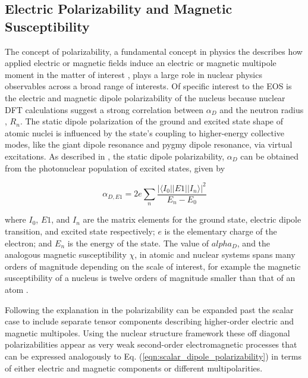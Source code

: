 \documentclass[cnatzke_thesis_proposal.tex]{subfiles}
\begin{document}
\subsection{Electric Polarizability and Magnetic Susceptibility}
The concept of polarizability, a fundamental concept in physics the describes how applied electric or magnetic fields induce an electric or magnetic multipole moment in the matter of interest \cite{jackson_classical_1999}, plays a large role in nuclear physics observables across a broad range of interests.
Of specific interest to the EOS is the electric and magnetic dipole polarizability of the nucleus because nuclear DFT calculations suggest a strong correlation between $\alpha_D$ and the neutron radius \cite{hagen_neutron_2016}, $R_{n}$. 
The static dipole polarization of the ground and excited state shape of atomic nuclei is influenced by the state's coupling to higher-energy collective modes, like the giant dipole resonance and pygmy dipole resonance, via virtual excitations. 
As described in \cite{soderstrom_electromagnetic_2020}, the static dipole polarizability, $\alpha_D$ can be obtained from the photonuclear population of excited states, given by

\begin{equation} \label{eqn:scalar_dipole_polarizability}
    \alpha_{D,E1} = 2 e \sum_n \frac{|\langle I_0 || E1 || I_n \rangle |^2}{E_n - E_0}
\end{equation}

where $I_0$, $E1$, and $I_n$ are the matrix elements for the ground state, electric dipole transition, and excited state respectively; $e$ is the elementary charge of the electron; and $E_n$ is the energy of the state. 
The value of $alpha_D$, and the analogous magnetic susceptibility $\chi$, in atomic and nuclear systems spans many orders of magnitude depending on the scale of interest, for example the magnetic susceptibility of a nucleus is twelve orders of magnitude smaller than that of an atom \cite{knupfer_scaling_1985}.

Following the explanation in \cite{soderstrom_electromagnetic_2020} the polarizability can be expanded past the scalar case to include separate tensor components describing higher-order electric and magnetic multipoles. 
Using the nuclear structure framework these off diagonal polarizabilities appear as very weak second-order electromagnetic processes that can be expressed analogously to Eq. (\ref{eqn:scalar_dipole_polarizability}) in terms of either electric and magnetic components or different multipolarities. 
\end{document}

